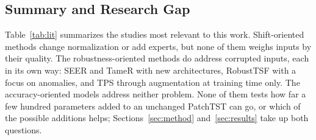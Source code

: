 \subsection{Summary and Research Gap}

Table~\ref{tab:lit} summarizes the studies most relevant to this work. Shift-oriented methods change normalization or add experts, but none of them weighs inputs by their quality. The robustness-oriented methods do address corrupted inputs, each in its own way: SEER and TameR with new architectures, RobustTSF with a focus on anomalies, and TPS through augmentation at training time only. The accuracy-oriented models address neither problem. None of them tests how far a few hundred parameters added to an unchanged PatchTST can go, or which of the possible additions helps; Sections~\ref{sec:method} and~\ref{sec:results} take up both questions.

